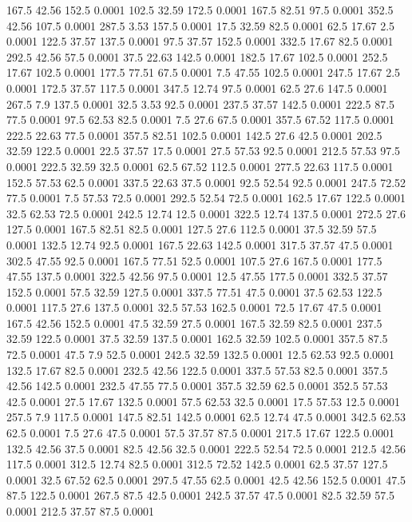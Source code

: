 167.5	42.56	152.5	0.0001
102.5	32.59	172.5	0.0001
167.5	82.51	97.5	0.0001
352.5	42.56	107.5	0.0001
287.5	3.53	157.5	0.0001
17.5	32.59	82.5	0.0001
62.5	17.67	2.5	0.0001
122.5	37.57	137.5	0.0001
97.5	37.57	152.5	0.0001
332.5	17.67	82.5	0.0001
292.5	42.56	57.5	0.0001
37.5	22.63	142.5	0.0001
182.5	17.67	102.5	0.0001
252.5	17.67	102.5	0.0001
177.5	77.51	67.5	0.0001
7.5	47.55	102.5	0.0001
247.5	17.67	2.5	0.0001
172.5	37.57	117.5	0.0001
347.5	12.74	97.5	0.0001
62.5	27.6	147.5	0.0001
267.5	7.9	137.5	0.0001
32.5	3.53	92.5	0.0001
237.5	37.57	142.5	0.0001
222.5	87.5	77.5	0.0001
97.5	62.53	82.5	0.0001
7.5	27.6	67.5	0.0001
357.5	67.52	117.5	0.0001
222.5	22.63	77.5	0.0001
357.5	82.51	102.5	0.0001
142.5	27.6	42.5	0.0001
202.5	32.59	122.5	0.0001
22.5	37.57	17.5	0.0001
27.5	57.53	92.5	0.0001
212.5	57.53	97.5	0.0001
222.5	32.59	32.5	0.0001
62.5	67.52	112.5	0.0001
277.5	22.63	117.5	0.0001
152.5	57.53	62.5	0.0001
337.5	22.63	37.5	0.0001
92.5	52.54	92.5	0.0001
247.5	72.52	77.5	0.0001
7.5	57.53	72.5	0.0001
292.5	52.54	72.5	0.0001
162.5	17.67	122.5	0.0001
32.5	62.53	72.5	0.0001
242.5	12.74	12.5	0.0001
322.5	12.74	137.5	0.0001
272.5	27.6	127.5	0.0001
167.5	82.51	82.5	0.0001
127.5	27.6	112.5	0.0001
37.5	32.59	57.5	0.0001
132.5	12.74	92.5	0.0001
167.5	22.63	142.5	0.0001
317.5	37.57	47.5	0.0001
302.5	47.55	92.5	0.0001
167.5	77.51	52.5	0.0001
107.5	27.6	167.5	0.0001
177.5	47.55	137.5	0.0001
322.5	42.56	97.5	0.0001
12.5	47.55	177.5	0.0001
332.5	37.57	152.5	0.0001
57.5	32.59	127.5	0.0001
337.5	77.51	47.5	0.0001
37.5	62.53	122.5	0.0001
117.5	27.6	137.5	0.0001
32.5	57.53	162.5	0.0001
72.5	17.67	47.5	0.0001
167.5	42.56	152.5	0.0001
47.5	32.59	27.5	0.0001
167.5	32.59	82.5	0.0001
237.5	32.59	122.5	0.0001
37.5	32.59	137.5	0.0001
162.5	32.59	102.5	0.0001
357.5	87.5	72.5	0.0001
47.5	7.9	52.5	0.0001
242.5	32.59	132.5	0.0001
12.5	62.53	92.5	0.0001
132.5	17.67	82.5	0.0001
232.5	42.56	122.5	0.0001
337.5	57.53	82.5	0.0001
357.5	42.56	142.5	0.0001
232.5	47.55	77.5	0.0001
357.5	32.59	62.5	0.0001
352.5	57.53	42.5	0.0001
27.5	17.67	132.5	0.0001
57.5	62.53	32.5	0.0001
17.5	57.53	12.5	0.0001
257.5	7.9	117.5	0.0001
147.5	82.51	142.5	0.0001
62.5	12.74	47.5	0.0001
342.5	62.53	62.5	0.0001
7.5	27.6	47.5	0.0001
57.5	37.57	87.5	0.0001
217.5	17.67	122.5	0.0001
132.5	42.56	37.5	0.0001
82.5	42.56	32.5	0.0001
222.5	52.54	72.5	0.0001
212.5	42.56	117.5	0.0001
312.5	12.74	82.5	0.0001
312.5	72.52	142.5	0.0001
62.5	37.57	127.5	0.0001
32.5	67.52	62.5	0.0001
297.5	47.55	62.5	0.0001
42.5	42.56	152.5	0.0001
47.5	87.5	122.5	0.0001
267.5	87.5	42.5	0.0001
242.5	37.57	47.5	0.0001
82.5	32.59	57.5	0.0001
212.5	37.57	87.5	0.0001
